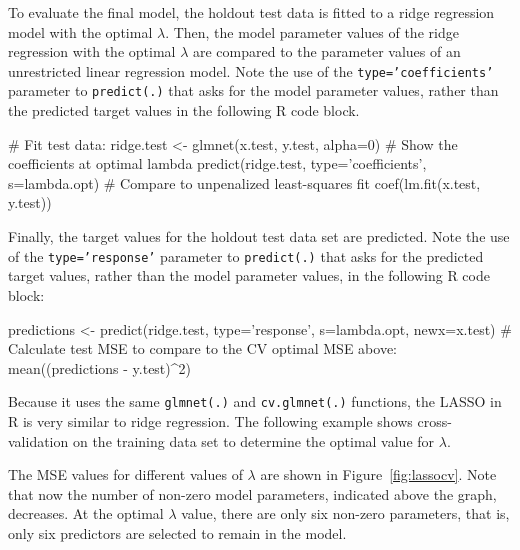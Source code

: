 To evaluate the final model, the holdout test data is fitted to a ridge regression model with the optimal $\lambda$. Then, the model parameter values of the ridge regression with the optimal $\lambda$ are compared to the parameter values of an unrestricted linear regression model. Note the use of the \texttt{type='coefficients'} parameter to \texttt{predict(.)} that asks for the model parameter values, rather than the predicted target values in the following R code block.

\begin{samepage}
\begin{Rcode}
# Fit test data:
ridge.test <- glmnet(x.test, y.test, alpha=0)
# Show the coefficients at optimal lambda
predict(ridge.test, type='coefficients', s=lambda.opt)
# Compare to unpenalized least-squares fit
coef(lm.fit(x.test, y.test))
\end{Rcode}
\end{samepage}

Finally, the target values for the holdout test data set are predicted. Note the use of the \texttt{type='response'} parameter to \texttt{predict(.)} that asks for the predicted target values, rather than the model parameter values, in the following R code block:

\begin{samepage}
\begin{Rcode}
predictions <- predict(ridge.test, type='response', 
                       s=lambda.opt, newx=x.test)
# Calculate test MSE to compare to the CV optimal MSE above:
mean((predictions - y.test)^2)
\end{Rcode}
\end{samepage}

Because it uses the same \texttt{glmnet(.)} and \texttt{cv.glmnet(.)} functions, the LASSO in R is very similar to ridge regression. The following example shows cross-validation on the training data set to determine the optimal value for $\lambda$. 

\begin{samepage}
\end{samepage}

The MSE values for different values of $\lambda$ are shown in Figure~\ref{fig:lassocv}. Note that now the number of non-zero model parameters, indicated above the graph, decreases. At the optimal $\lambda$ value, there are only six non-zero parameters, that is, only six predictors are selected to remain in the model.

